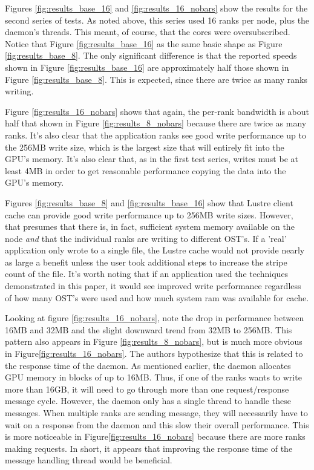 
Figures \ref{fig:results_base_16} and \ref{fig:results_16_nobars} show the results for the second series of tests.  As noted above, this series used 16 ranks per node, plus the daemon's threads.  This meant, of course, that the cores were oversubscribed.  Notice that Figure \ref{fig:results_base_16} as the same basic shape as Figure \ref{fig:results_base_8}.  The only significant difference is that the reported speeds shown in Figure \ref{fig:results_base_16} are approximately half those shown in Figure \ref{fig:results_base_8}.  This is expected, since there are twice as many ranks writing.

Figure \ref{fig:results_16_nobars} shows that again, the per-rank bandwidth is about half that shown in Figure \ref{fig:results_8_nobars} because there are twice as many ranks.  It's also clear that the application ranks see good write performance up to the 256MB write size, which is the largest size that will entirely fit into the GPU's memory.  It's also clear that, as in the first test series, writes must be at least 4MB in order to get reasonable performance copying the data into the GPU's memory.

Figures \ref{fig:results_base_8} and \ref{fig:results_base_16} show that Lustre client cache can provide good write performance up to 256MB write sizes.  However, that presumes that there is, in fact, sufficient system memory available on the node \emph{and} that the individual ranks are writing to different OST's.  If a 'real' application only wrote to a single file, the Lustre cache would not provide nearly as large a benefit unless the user took additional steps to increase the stripe count of the file.  It's worth noting that if an application used the techniques demonstrated in this paper, it would see improved write performance regardless of how many OST's were used and how much system ram was available for cache.

Looking at figure \ref{fig:results_16_nobars}, note the drop in performance between 16MB and 32MB and the slight downward trend from 32MB to 256MB.  This pattern also appears in Figure \ref{fig:results_8_nobars}, but is much more obvious in Figure\ref{fig:results_16_nobars}.  The authors hypothesize that this is related to the response time of the daemon.  As mentioned earlier, the daemon allocates GPU memory in blocks of up to 16MB.  Thus, if one of the ranks wants to write more than 16GB, it will need to go through more than one request/response message cycle.  However, the daemon only has a single thread to handle these messages.  When multiple ranks are sending message, they will necessarily have to wait on a response from the daemon and this slow their overall performance.  This is more noticeable in Figure\ref{fig:results_16_nobars} because there are more ranks making requests.
In short, it appears that improving the response time of the message handling thread would be beneficial.
